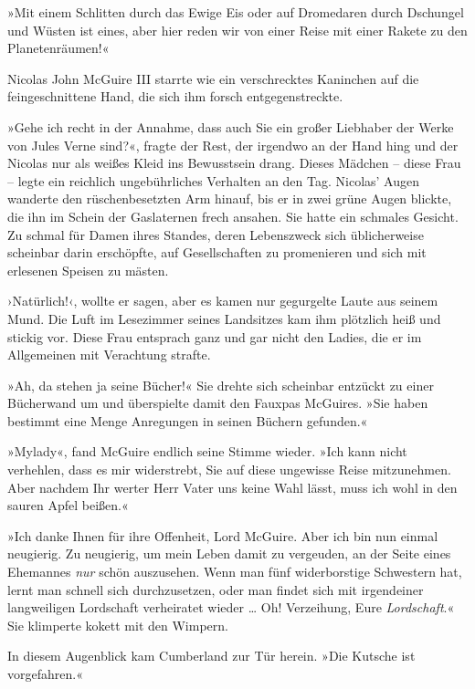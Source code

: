»Mit einem Schlitten durch das Ewige Eis oder auf Dromedaren durch
Dschungel und Wüsten ist eines, aber hier reden wir von einer Reise
mit einer Rakete zu den Planetenräumen!«

\tb

Nicolas John McGuire III starrte wie ein verschrecktes Kaninchen
auf die feingeschnittene Hand, die sich ihm forsch
entgegenstreckte.

»Gehe ich recht in der Annahme, dass auch Sie ein großer Liebhaber
der Werke von Jules Verne sind?«, fragte der Rest, der irgendwo an
der Hand hing und der Nicolas nur als weißes Kleid ins Bewusstsein
drang. Dieses Mädchen – diese Frau – legte ein reichlich
ungebührliches Verhalten an den Tag. Nicolas’ Augen wanderte den
rüschenbesetzten Arm hinauf, bis er in zwei grüne Augen blickte,
die ihn im Schein der Gaslaternen frech ansahen. Sie hatte ein
schmales Gesicht. Zu schmal für Damen ihres Standes, deren
Lebenszweck sich üblicherweise scheinbar darin erschöpfte, auf
Gesellschaften zu promenieren und sich mit erlesenen Speisen zu
mästen.

›Natürlich!‹, wollte er sagen, aber es kamen nur gegurgelte Laute
aus seinem Mund. Die Luft im Lesezimmer seines Landsitzes kam ihm
plötzlich heiß und stickig vor. Diese Frau entsprach ganz und gar
nicht den Ladies, die er im Allgemeinen mit Verachtung strafte.

»Ah, da stehen ja seine Bücher!« Sie drehte sich scheinbar entzückt
zu einer Bücherwand um und überspielte damit den Fauxpas McGuires.
»Sie haben bestimmt eine Menge Anregungen in seinen Büchern
gefunden.«

»Mylady«, fand McGuire endlich seine Stimme wieder. »Ich kann nicht
verhehlen, dass es mir widerstrebt, Sie auf diese ungewisse Reise
mitzunehmen. Aber nachdem Ihr werter Herr Vater uns keine Wahl
lässt, muss ich wohl in den sauren Apfel beißen.«

»Ich danke Ihnen für ihre Offenheit, Lord McGuire. Aber ich bin nun
einmal neugierig. Zu neugierig, um mein Leben damit zu vergeuden,
an der Seite eines Ehemannes \emph{nur} schön auszusehen. Wenn man
fünf widerborstige Schwestern hat, lernt man schnell sich
durchzusetzen, oder man findet sich mit irgendeiner langweiligen
Lordschaft verheiratet wieder … Oh! Verzeihung, Eure
\emph{Lordschaft}.« Sie klimperte kokett mit den Wimpern.

\bigpar

In diesem Augenblick kam Cumberland zur Tür herein. »Die Kutsche
ist vorgefahren.«

